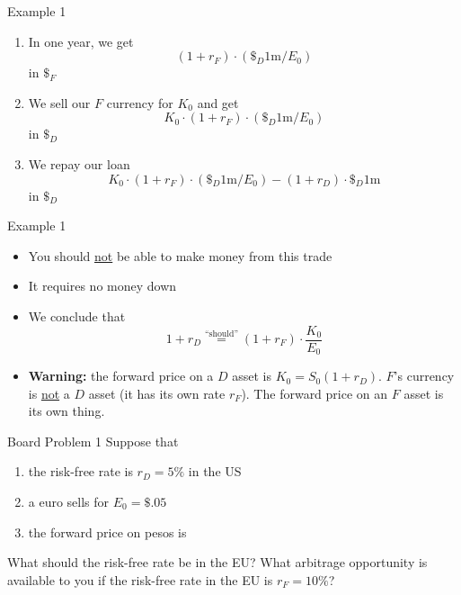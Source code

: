 \documentclass{beamer}
\begin{document}
\begin{frame}{Example 1}
    \begin{enumerate}\addtocounter{enumi}{4}
        \item In one year, we get  
            \begin{equation}
                (1+r_{F})\cdot (\$_{D}1\text{m}/E_{0})
            \end{equation}
            in $\$_{F}$
        \item We sell our $F$ currency for $K_{0}$ and get
            \begin{equation}
                K_{0}\cdot(1+r_{F})\cdot(\$_{D}1\text{m}/E_{0})
            \end{equation}
            in $\$_{D}$
        \item We repay our loan
            \begin{equation}
                K_{0}\cdot(1+r_{F})\cdot(\$_{D}1\text{m}/E_{0})-(1+r_{D})\cdot\$_{D}1\text{m}
            \end{equation}
            in $\$_{D}$
    \end{enumerate}
\end{frame}

\begin{frame}{Example 1}   
    \begin{itemize}
        \item You should \underline{not} be able to make money from this trade
        \item It requires no money down
        \item We conclude that
            \begin{equation}
                1+r_{D}\overset{\text{``should''}}{=}(1+r_{F})\cdot\frac{K_{0}}{E_{0}}
            \end{equation}
        \item\textbf{Warning:} the forward price on a $D$ asset is $K_{0}=S_{0}(1+r_{D})$. $F$'s currency is \underline{not} a $D$ asset (it has its own rate $r_{F}$). The forward price on an $F$ asset is its own thing. 
    \end{itemize}
\end{frame}

\begin{frame}{Board Problem 1}
        Suppose that
        \begin{enumerate}
            \item the risk-free rate is $r_{D}=5\%$ in the US 
            \item a euro sells for $E_{0}=\$.05$
            \item the forward price on pesos is 
        \end{enumerate}
        What should the risk-free rate be in the EU? What arbitrage opportunity is available to you if the risk-free rate in the EU is $r_{F}=10\%$? 
\end{frame}
\end{document}
